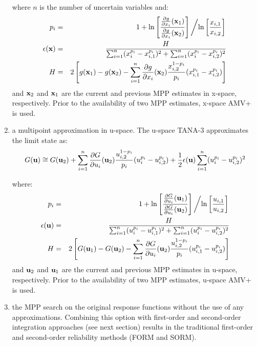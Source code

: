 \begin{enumerate}
\noindent where $n$ is the number of uncertain variables and:
\begin{eqnarray}
p_i & = & 1 + \ln \left[ \frac{\frac{\partial g}{\partial x_i}({\bf x}_1)}
{\frac{\partial g}{\partial x_i}({\bf x}_2)} \right] \left/ 
\ln \left[ \frac{x_{i,1}}{x_{i,2}} \right] \right. \label{eq:tana_pi_x} \\
\epsilon({\bf x}) & = & \frac{H}{\sum_{i=1}^n (x_i^{p_i} - x_{i,1}^{p_i})^2 + 
\sum_{i=1}^n (x_i^{p_i} - x_{i,2}^{p_i})^2} \label{eq:tana_eps_x} \\
H & = & 2 \left[ g({\bf x}_1) - g({\bf x}_2) - \sum_{i=1}^n 
\frac{\partial g}{\partial x_i}({\bf x}_2) \frac{x_{i,2}^{1-p_i}}{p_i} 
(x_{i,1}^{p_i} - x_{i,2}^{p_i}) \right] \label{eq:tana_H_x}
\end{eqnarray}
\noindent and ${\bf x}_2$ and ${\bf x}_1$ are the current and previous
MPP estimates in x-space, respectively.  Prior to the availability of
two MPP estimates, x-space AMV+ is used.

\item a multipoint approximation in u-space. The u-space TANA-3
approximates the limit state as:
\begin{equation}
G({\bf u}) \cong G({\bf u}_2) + \sum_{i=1}^n 
\frac{\partial G}{\partial u_i}({\bf u}_2) \frac{u_{i,2}^{1-p_i}}{p_i} 
(u_i^{p_i} - u_{i,2}^{p_i}) + \frac{1}{2} \epsilon({\bf u}) \sum_{i=1}^n 
(u_i^{p_i} - u_{i,2}^{p_i})^2 \label{eq:tana_G}
\end{equation}

\noindent where:
\begin{eqnarray}
p_i & = & 1 + \ln \left[ \frac{\frac{\partial G}{\partial u_i}({\bf u}_1)}
{\frac{\partial G}{\partial u_i}({\bf u}_2)} \right] \left/ 
\ln \left[ \frac{u_{i,1}}{u_{i,2}} \right] \right. \label{eq:tana_pi_u} \\
\epsilon({\bf u}) & = & \frac{H}{\sum_{i=1}^n (u_i^{p_i} - u_{i,1}^{p_i})^2 + 
\sum_{i=1}^n (u_i^{p_i} - u_{i,2}^{p_i})^2} \label{eq:tana_eps_u} \\
H & = & 2 \left[ G({\bf u}_1) - G({\bf u}_2) - \sum_{i=1}^n 
\frac{\partial G}{\partial u_i}({\bf u}_2) \frac{u_{i,2}^{1-p_i}}{p_i} 
(u_{i,1}^{p_i} - u_{i,2}^{p_i}) \right] \label{eq:tana_H_u}
\end{eqnarray}
\noindent and ${\bf u}_2$ and ${\bf u}_1$ are the current and previous
MPP estimates in u-space, respectively.  Prior to the availability of
two MPP estimates, u-space AMV+ is used.

\item the MPP search on the original response functions without the 
use of any approximations.  Combining this option with first-order and
second-order integration approaches (see next section) results in the
traditional first-order and second-order reliability methods (FORM and
SORM).
\end{enumerate}

